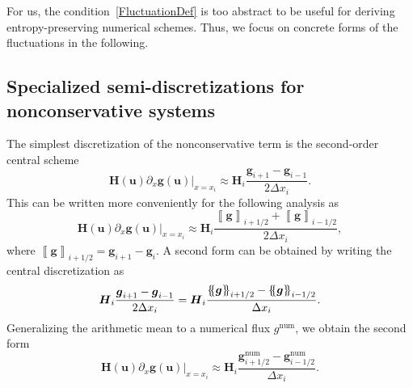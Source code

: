 \documentclass[]{scrartcl}
\newcommand*{\ldblbrace}{\{\mskip-5mu \left \{}
\newcommand*{\rdblbrace}{ \}\mskip-5mu \right \}}
\newcommand{\mean}[1]{\left\ldblbrace #1 \right\rdblbrace}
\renewcommand{\vec}[1]{\boldsymbol{#1}}
\newcommand{\jump}[1]{\left\llbracket #1  \right\rrbracket}
\theoremstyle{definition}
\begin{document}
For us, the condition~\eqref{FluctuationDef} is too abstract to be useful for deriving entropy-preserving numerical schemes.
Thus, we focus on concrete forms of the fluctuations in the following.

\subsection{Specialized semi-discretizations for nonconservative systems}

The simplest discretization of the nonconservative term is the second-order central scheme
\begin{equation}
\vec{H}(\vec{u}) \partial_x \vec{g}(\vec{u})\Big |_{x = x_i} \approx \vec{H}_i \frac{\vec{g}_{i+1} - \vec{g}_{i-1}}{2 \Delta x_i}.
\label{FV_form0}
\end{equation}
This can be written more conveniently for the following analysis as
\begin{equation}
\vec{H}(\vec{u}) \partial_x \vec{g}(\vec{u})\Big |_{x = x_i} \approx \vec{H}_i \frac{\jump{\vec{g}}_{i+1/2} +\jump{\vec{g}}_{i-1/2}}{2 \Delta x_i},
\label{FV_form1}
\end{equation}
where $\jump{\vec{g}}_{i+1/2} = \vec{g}_{i+1} - \vec{g}_i$.
A second form can be obtained by writing the central discretization as
\begin{equation*}
    \vec{H}_i \frac{\vec{g}_{i+1} - \vec{g}_{i-1}}{2 \Delta x_i}
    =
    \vec{H}_i \frac{\mean{\vec{g}}_{i+1/2} - \mean{\vec{g}}_{i-1/2}}{ \Delta x_i}.
\end{equation*}
Generalizing the arithmetic mean to a numerical flux $g^\mathrm{num}$, we obtain the second form
\begin{equation}
\vec{H}(\vec{u}) \partial_x \vec{g}(\vec{u})\Big |_{x = x_i} \approx \vec{H}_i \frac{\vec{g}_{i+1/2}^{\mathrm{num}} - \vec{g}^{\mathrm{num}}_{i-1/2}}{\Delta x_i}.
\label{FV_form2}
\end{equation}
\end{document}
